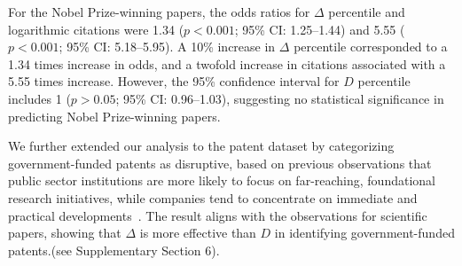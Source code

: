 \documentclass[12pt]{article}
\begin{document}
For the Nobel Prize-winning papers, the odds ratios for $\Delta$ percentile and logarithmic citations were 1.34 ($p<0.001$; 95\% CI: 1.25--1.44) and 5.55 ($p<0.001$; 95\% CI: 5.18--5.95). A 10\% increase in $\Delta$ percentile corresponded to a 1.34 times increase in odds, and a twofold increase in citations associated with a 5.55 times increase. However, the 95\% confidence interval for $D$ percentile includes 1 ($p>0.05$; 95\% CI: 0.96--1.03), suggesting no statistical significance in predicting Nobel Prize-winning papers.

We further extended our analysis to the patent dataset by categorizing government-funded patents as disruptive, based on previous observations that public sector institutions are more likely to focus on far-reaching, foundational research initiatives, while companies tend to concentrate on immediate and practical developments~\cite{funk2017dynamic, li2017applied,fleming2019government}. The result aligns with the observations for scientific papers, showing that $\Delta$ is more effective than $D$ in identifying government-funded patents.(see Supplementary Section 6).
\end{document}
